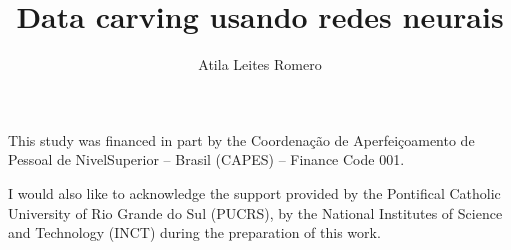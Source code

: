 \documentclass[english,oneside]{pucrs-ppgcc}
\author{Atila Leites Romero}
\title{Data carving usando redes neurais}
      {Data carving using neural networks}
\begin{document}
%


\begin{agradecimentos}
This study was financed in part by the Coordenação de Aperfeiçoamento de Pessoal de NivelSuperior – Brasil (CAPES) – Finance Code 001.

I would also like to acknowledge the support provided by the Pontifical Catholic University of Rio Grande do Sul (PUCRS), by the National Institutes of Science and Technology (INCT)
during the preparation of this work.

\end{agradecimentos}
\end{document}

